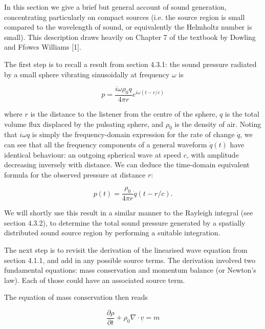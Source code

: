  In this section we give a brief but general account of sound generation, 
  concentrating particularly on compact sources (i.e. the source region is 
  small compared to the wavelength of sound, or equivalently the Helmholtz 
  number is small). This description draws heavily on Chapter 7 of the textbook 
  by Dowling and Ffowcs Williams [1]. 

  The first step is to recall a result from section 4.3.1: the sound pressure 
  radiated by a small sphere vibrating sinusoidally at frequency $\omega$ is 

  \begin{equation*}p=\dfrac{i \omega \rho_0 q}{4 \pi r} e^{i \omega(t-r/c)} 
  \tag{1}\end{equation*} 

  \noindent{}where $r$ is the distance to the listener from the centre of the 
  sphere, $q$ is the total volume flux displaced by the pulsating sphere, and 
  $\rho_0$ is the density of air. Noting that $i \omega q$ is simply the 
  frequency-domain expression for the rate of change $\dot{q}$, we can see that 
  all the frequency components of a general waveform $\dot{q}(t)$ have 
  identical behaviour: an outgoing spherical wave at speed $c$, with amplitude 
  decreasing inversely with distance. We can deduce the time-domain equivalent 
  formula for the observed pressure at distance $r$: 

  \begin{equation*}p(t)=\dfrac{\rho_0 }{4 \pi r} \dot{q}(t-r/c) . 
  \tag{2}\end{equation*} 

  We will shortly use this result in a similar manner to the Rayleigh integral 
  (see section 4.3.2), to determine the total sound pressure generated by a 
  spatially distributed sound source region by performing a suitable 
  integration. 

  The next step is to revisit the derivation of the linearised wave equation 
  from section 4.1.1, and add in any possible source terms. The derivation 
  involved two fundamental equations: mass conservation and momentum balance 
  (or Newton's law). Each of those could have an associated source term. 

  The equation of mass conservation then reads 

  \begin{equation*}\dfrac{\partial \rho}{\partial t} + \rho_0 \nabla \cdot 
  \underline{v} = m \tag{3}\end{equation*} 

